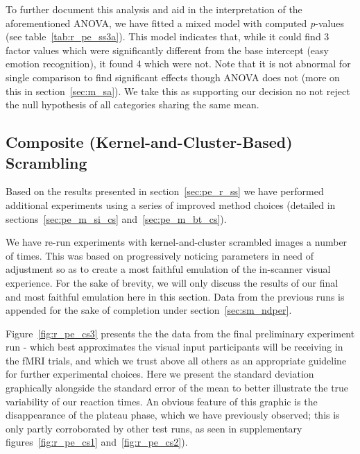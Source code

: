 	    To further document this analysis and aid in the interpretation of the aforementioned ANOVA, we have fitted a mixed model with computed \textit{p}-values (see table~\ref{tab:r_pe_ss3a}).
	    This model indicates that, while it could find 3 factor values which were significantly different from the base intercept (easy emotion recognition), it found 4 which were not.
	    Note that it is not abnormal for single comparison to find significant effects though ANOVA does not (more on this in section~\ref{sec:m_sa}).
	    We take this as supporting our decision no not reject the null hypothesis of all categories sharing the same mean.
	\subsection{Composite (Kernel-and-Cluster-Based) Scrambling}\label{sec:pe_r_cs}
	    Based on the results presented in section~\ref{sec:pe_r_ss} we have performed additional experiments using a series of improved method choices (detailed in sections~\ref{sec:pe_m_si_cs} and~\ref{sec:pe_m_bt_cs}).
	    
	    We have re-run experiments with kernel-and-cluster scrambled images a number of times.
	    This was based on progressively noticing parameters in need of adjustment so as to create a most faithful emulation of the in-scanner visual experience.
	    For the sake of brevity, we will only discuss the results of our final and most faithful emulation here in this section.
	    Data from the previous runs is appended for the sake of completion under section~\ref{sec:sm_ndper}.
	     
	    
	    Figure~\ref{fig:r_pe_cs3} presents the the data from the final preliminary experiment run - which best approximates the visual input participants will be receiving in the fMRI trials, and which we trust above all others as an appropriate guideline for further experimental choices.
	    Here we present the standard deviation graphically alongside the standard error of the mean to better illustrate the true variability of our reaction times.
	    An obvious feature of this graphic is the disappearance of the plateau phase, which we have previously observed; this is only partly corroborated by other test runs, as seen in supplementary figures~\ref{fig:r_pe_cs1} and~\ref{fig:r_pe_cs2}).
	    
